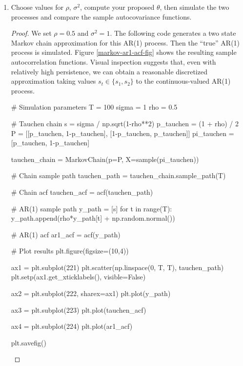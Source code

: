 \documentclass[oneside,reqno]{amsart}
\theoremstyle{definition}
\begin{document}
\begin{enumerate}[label=(\roman*)]
\begin{proof}
\begin{align*}
		&= \frac{1}{2} \frac{1+\rho^2}{2} s_1^2 + \frac{1-\rho^2}{2} s_1s_2 + \frac{1}{2} \frac{1+\rho^2}{2} s_2 \\
		&= \frac{\sigma^2}{1-\rho^2}\rho^\tau = \gamma_y(\tau),
\end{align*}
the desired result.
\end{proof}
\item
Choose values for $\rho$, $\sigma^2$, compute your proposed $\theta$, then simulate the two processes and compare the sample autocovariance functions.
\begin{proof} 
We set $\rho = 0.5$ and $\sigma^2=1$. The following code generates a two state Markov chain approximation for this AR(1) process. Then the ``true'' AR(1) process is simulated. Figure \ref{markov-ar1-acf-fig} shows the resulting sample autocorrelation functions. Visual inspection suggests that, even with relatively high persistence, we can obtain a reasonable discretized approximation taking values $s_t \in \{s_1, s_2\}$ to the continuous-valued AR(1) process.
\begin{python3code}
# Simulation parameters 
T = 100
sigma = 1
rho = 0.5

# Tauchen chain
s = sigma / np.sqrt(1-rho**2)
p_tauchen = (1 + rho) / 2
P = [[p_tauchen, 1-p_tauchen], [1-p_tauchen, p_tauchen]]
pi_tauchen = [p_tauchen, 1-p_tauchen]

tauchen_chain = MarkovChain(p=P, X=sample(pi_tauchen))

# Chain sample path
tauchen_path = tauchen_chain.sample_path(T)

# Chain acf
tauchen_acf = acf(tauchen_path)

# AR(1) sample path
y_path = [s]
for t in range(T):
    y_path.append(rho*y_path[t] + np.random.normal())

# AR(1) acf
ar1_acf = acf(y_path)

# Plot results 
plt.figure(figsize=(10,4))

ax1 = plt.subplot(221)
plt.scatter(np.linspace(0, T, T), tauchen_path)
plt.setp(ax1.get_xticklabels(), visible=False)

ax2 = plt.subplot(222, sharex=ax1)
plt.plot(y_path)

ax3 = plt.subplot(223)
plt.plot(tauchen_acf)

ax4 = plt.subplot(224)
plt.plot(ar1_acf)

plt.savefig()
\end{python3code}


\end{proof}
\end{enumerate}
\end{document}
